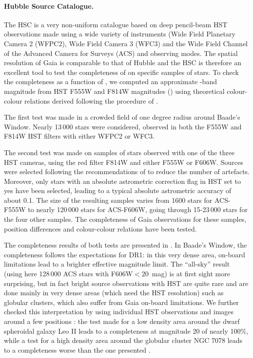 \paragraph{Hubble Source Catalogue.} The HSC is a very non-uniform catalogue based on deep pencil-beam HST observations made using a wide variety of instruments (Wide Field Planetary Camera 2 (WFPC2), Wide Field Camera 3 (WFC3) and the Wide Field Channel of the Advanced Camera for Surveys (ACS) and observing modes. The spatial resolution of Gaia is comparable to that of Hubble and the HSC is therefore an excellent tool to test the completeness of {} on specific samples of stars. To check the completeness as a function of \gmag, we computed an approximate \gmag-band magnitude from HST F555W and F814W magnitudes (\ghst) using theoretical colour-colour relations derived following the procedure of \cite{2010A&A...523A..48J}. 

The first test was made in a crowded field of one degree radius around Baade's Window. Nearly 13\,000 stars were considered, observed in both the F555W and F814W HST filters with either WFPC2 or WFC3. 

The second test was made on samples of stars observed with one of the three HST cameras, using the red filter F814W and either F555W or F606W. Sources were selected following the recommendations of \cite{2016AJ....151..134W} to reduce the number of artefacts.
Moreover, only stars with an absolute astrometric correction flag in HST set to yes have been selected, leading to a typical absolute astrometric accuracy of about 0.1\arcsec. The size of the resulting samples varies from 1600 stars for ACS-F555W to nearly 120\,000 stars for ACS-F606W, going through 15-23\,000 stars for the four other samples. The completeness of Gaia observations for these samples, position differences and colour-colour relations have been tested. 

The completeness results of both tests are presented in . In Baade's Window, the completeness follows the expectations for DR1: in this very dense area, on-board limitations lead to a brighter effective magnitude limit. The ``all-sky'' result (using here 128\,000 ACS stars with F606W$<20$~mag)
is at first sight more surprising, but in fact bright source observations with HST are quite rare and are done mainly in very dense areas (which need the HST resolution) such as globular clusters, which also suffer from Gaia on-board limitations.  We further checked this interpretation by using individual HST observations and images around a few positions : the test made for a low density area around the dwarf spheroidal galaxy Leo II \citep{2011ApJ...741..100L} leads to a completeness at magnitude 20 of nearly 100\%, while a test for a high density area around the globular cluster NGC 7078 \citep{2014ApJ...797..115B} leads to a completeness worse than the one presented .


